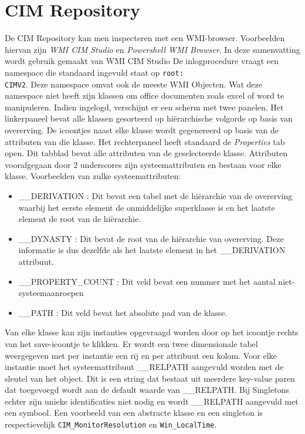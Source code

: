 \documentclass{report}
\begin{document}
	\section{CIM Repository}
	De CIM Repository kan men inspecteren met een WMI-browser. Voorbeelden hiervan zijn \textit{WMI CIM Studio} en \textit{Powershell WMI Browser}. In deze samenvatting wordt gebruik gemaakt van WMI CIM Studio
	De inlogprocedure vraagt een namespace die standaard ingevuld staat op \texttt{root:\\CIMV2}. Deze namespace omvat ook de meeste WMI Objecten. Wat deze namespace niet heeft zijn klassen om office documenten zoals excel of word te manipuleren.
	Indien ingelogd, verschijnt er een scherm met twee panelen. Het linkerpaneel bevat alle klassen gesorteerd op hiërarchische volgorde op basis van overerving. De icoontjes naast elke klasse wordt gegenereerd op basis van de attributen van die klasse.
	Het rechterpaneel heeft standaard de \textit{Properties} tab open. Dit tabblad bevat alle attributen van de geselecteerde klasse. Attributen voorafgegaan door 2 underscores zijn systeemattributen en bestaan voor elke klasse.
	Voorbeelden van zulke systeemattributen:
	\begin{itemize}
		\item \_\_DERIVATION : Dit bevat een tabel met de hiërarchie van de overerving waarbij het eerste element de onmiddelijke superklasse is en het laatste element de root van de hiërarchie.
		\item \_\_DYNASTY : Dit bevat de root van de hiërarchie van overerving. Deze informatie is dus dezelfde als het laatste element in het \_\_DERIVATION attribuut.
		\item \_\_PROPERTY\_COUNT : Dit veld bevat een nummer met het aantal niet-systeemaanroepen
		\item \_\_PATH : Dit veld bevat het absolute pad van de klasse.
	\end{itemize}
	Van elke klasse kan zijn instanties opgevraagd worden door op het icoontje rechts van het save-icoontje te klikken. Er wordt een twee dimensionale tabel weergegeven met per instantie een rij en per attribuut een kolom.
	Voor elke instantie moet het systeemattribuut \_\_RELPATH aangevuld worden met de sleutel van het object. Dit is een string dat bestaat uit meerdere key-value paren dat toegevoegd wordt aan de default waarde van \_\_RELPATH.
	Bij Singletons echter zijn unieke identificaties niet nodig en wordt \_\_RELPATH aangevuld met een \@ symbool. Een voorbeeld van een abstracte klasse en een singleton is respectievelijk \texttt{CIM\_MonitorResolution} en \texttt{Win\_LocalTime}. 
\end{document}
